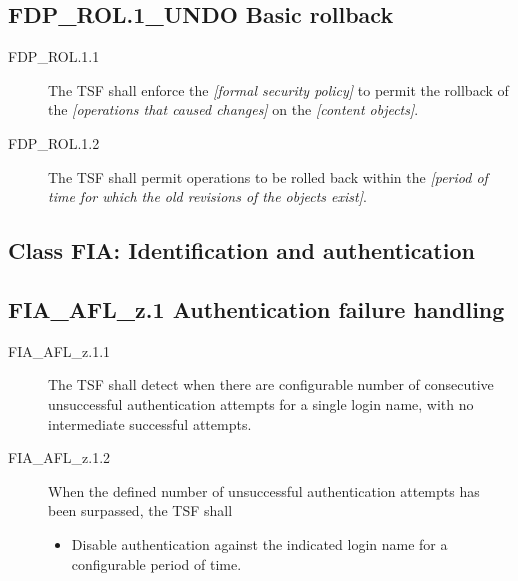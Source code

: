 \documentclass[12pt,english]{scrbook}
\begin{document}



\subsection{FDP{\_}ROL.1{\_}UNDO Basic rollback}
\begin{description}
\item[FDP{\_}ROL.1.1 ]

The TSF shall enforce the \emph{{[}formal security policy]} to permit
the rollback of the \emph{{[}operations that caused changes]} on the \emph{{[}content
objects]}.

\item[FDP{\_}ROL.1.2 ]

The TSF shall permit operations to be rolled back
within the \emph{{[}period of time for which the old revisions of the objects
exist]}.

\end{description}





\subsection{Class FIA: Identification and authentication}





\subsection{FIA{\_}AFL{\_}z.1 Authentication failure handling}
\begin{description}
\item[FIA{\_}AFL{\_}z.1.1]

The TSF shall detect when there are configurable number of consecutive
unsuccessful authentication attempts for a single login name,
with no intermediate successful attempts.

\item[FIA{\_}AFL{\_}z.1.2 ]

When the defined number of unsuccessful authentication attempts
has been surpassed, the TSF shall
\begin{itemize}
\item {} 
Disable authentication against the indicated login name for a
configurable period of time.

\end{itemize}

\end{description}
\end{document}

